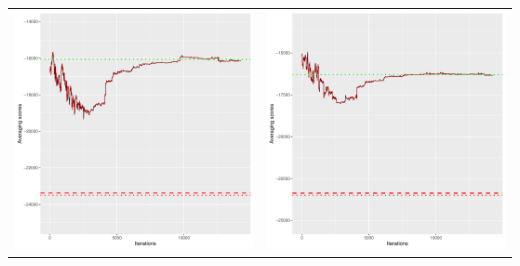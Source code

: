 \documentclass[]{scrartcl}
\begin{document}
\begin{table}[h!]
\begin{tabular}{cc}
\includegraphics[scale = 0.4]{./figs/win95pts/v3/25/avgBoundsEvolution-14252.pdf} & 
\includegraphics[scale = 0.4]{./figs/win95pts/v3/50/avgBoundsEvolution-14252.pdf} \\

\end{tabular}
\end{table}
\end{document}
